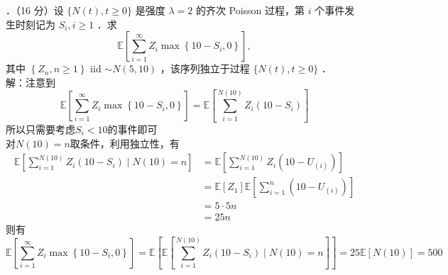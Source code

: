 \documentclass[UTF8,openany]{book}
\begin{document}
．（16 分）设 $\{N(t), t \geq 0\}$ 是强度 $\lambda=2$ 的齐次 Poisson 过程，第 $i$ 个事件发生时刻记为 $S_{i}, i \geq 1$ ．求
$$
\mathbb{E}\left[\sum_{i=1}^{\infty} Z_{i} \max \left\{10-S_{i}, 0\right\}\right],
$$
其中 $\left\{Z_{n}, n \geq 1\right\}$ iid $\sim N(5,10)$ ，该序列独立于过程 $\{N(t), t \geq 0\}$ ．\\
解：注意到
\[
\mathbb{E}\left[\sum_{i=1}^{\infty} Z_{i} \max \left\{10-S_{i}, 0\right\}\right]=\mathbb{E}\left[\sum_{i=1}^{N(10)} Z_{i}  (10-S_{i}) \right]
\]
所以只需要考虑$S_i<10$的事件即可\\
对$N(10)=n$取条件，利用独立性，有
\begin{align*}
	\mathbb{E}\left[\sum_{i=1}^{N(10)} Z_{i}  (10-S_{i})\mid N(10)=n \right] & =\mathbb{E}\left[\sum_{i=1}^{N(10)} Z_{i}  (10-U_{(i)}) \right] \\
	& = \mathbb{E}[Z_1] \mathbb{E}\left[ \sum_{i=1}^n (10-U_{(i)})\right] \\
	&=5\cdot 5n\\
	&=25n
\end{align*}
则有
\[
\mathbb{E}\left[\sum_{i=1}^{\infty} Z_{i} \max \left\{10-S_{i}, 0\right\}\right]=\mathbb{E}\left[\mathbb{E}\left[\sum_{i=1}^{N(10)} Z_{i}  (10-S_{i})\mid N(10)=n \right] \right] =25\mathbb{E}[N(10)]=500
\]\\
\end{document}
